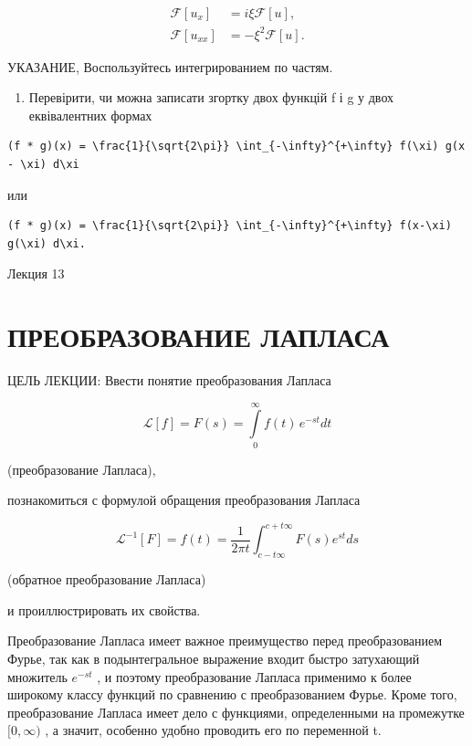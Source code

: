 \documentclass[
  ukrainian,
]{article}
\providecommand{\tightlist}{%
  \setlength{\itemsep}{0pt}\setlength{\parskip}{0pt}}
\begin{document}
\[
\begin{aligned} \mathcal{F}\left[u_{x}\right] &= i\xi \mathcal{F}\left[u\right], \\ \mathcal{F}\left[u_{xx}\right] &= -\xi^{2} \mathcal{F}\left[u\right]. \end{aligned}
\]

УКАЗАНИЕ, Воспользуйтесь интегрированием по частям.

\begin{enumerate}
\def\labelenumi{\arabic{enumi}.}
\setcounter{enumi}{4}
\tightlist
\item
  Перевірити, чи можна записати згортку двох функцій f і g у двох
  еквівалентних формах
\end{enumerate}

\begin{verbatim}
(f * g)(x) = \frac{1}{\sqrt{2\pi}} \int_{-\infty}^{+\infty} f(\xi) g(x - \xi) d\xi
\end{verbatim}

или

\begin{verbatim}
(f * g)(x) = \frac{1}{\sqrt{2\pi}} \int_{-\infty}^{+\infty} f(x-\xi) g(\xi) d\xi.
\end{verbatim}

Лекция 13

\section{ПРЕОБРАЗОВАНИЕ
ЛАПЛАСА}\label{ux43fux440ux435ux43eux431ux440ux430ux437ux43eux432ux430ux43dux438ux435-ux43bux430ux43fux43bux430ux441ux430}

ЦЕЛЬ ЛЕКЦИИ: Ввести понятие преобразования Лапласа

\[
\mathscr{L}[f] = F(s) = \int\limits_0^\infty f(t)\,e^{-st}dt
\]

(преобразование Лапласа),

познакомиться с формулой обращения преобразования Лапласа

\[
\mathscr{L}^{-1}[F] = f(t) = \frac{1}{2\pi t} \int_{c-t\infty}^{c+t\infty} F(s) e^{st} ds
\]

(обратное преобразование Лапласа)

и проиллюстрировать их свойства.

Преобразование Лапласа имеет важное преимущество перед преобразованием
Фурье, так как в подынтегральное выражение входит быстро затухающий
множитель \(e^{-st}\) , и поэтому преобразование Лапласа применимо к
более широкому классу функций по сравнению с преобразованием Фурье.
Кроме того, преобразование Лапласа имеет дело с функциями, определенными
на промежутке \([0, \infty)\) , а значит, особенно удобно проводить его
по переменной t.
\end{document}
